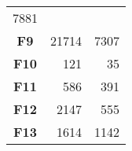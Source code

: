 \documentclass[12pt,a4paper]{article}
\begin{document}
\begin{longtable}[c]{@{}crr@{}}
\begin{minipage}[t]{0.25\columnwidth}
7881
\strut\end{minipage}\tabularnewline
\begin{minipage}[t]{0.13\columnwidth}\centering\strut
\textbf{F9}
\strut\end{minipage} &
\begin{minipage}[t]{0.09\columnwidth}\raggedleft\strut
21714
\strut\end{minipage} &
\begin{minipage}[t]{0.25\columnwidth}\raggedleft\strut
7307
\strut\end{minipage}\tabularnewline
\begin{minipage}[t]{0.13\columnwidth}\centering\strut
\textbf{F10}
\strut\end{minipage} &
\begin{minipage}[t]{0.09\columnwidth}\raggedleft\strut
121
\strut\end{minipage} &
\begin{minipage}[t]{0.25\columnwidth}\raggedleft\strut
35
\strut\end{minipage}\tabularnewline
\begin{minipage}[t]{0.13\columnwidth}\centering\strut
\textbf{F11}
\strut\end{minipage} &
\begin{minipage}[t]{0.09\columnwidth}\raggedleft\strut
586
\strut\end{minipage} &
\begin{minipage}[t]{0.25\columnwidth}\raggedleft\strut
391
\strut\end{minipage}\tabularnewline
\begin{minipage}[t]{0.13\columnwidth}\centering\strut
\textbf{F12}
\strut\end{minipage} &
\begin{minipage}[t]{0.09\columnwidth}\raggedleft\strut
2147
\strut\end{minipage} &
\begin{minipage}[t]{0.25\columnwidth}\raggedleft\strut
555
\strut\end{minipage}\tabularnewline
\begin{minipage}[t]{0.13\columnwidth}\centering\strut
\textbf{F13}
\strut\end{minipage} &
\begin{minipage}[t]{0.09\columnwidth}\raggedleft\strut
1614
\strut\end{minipage} &
\begin{minipage}[t]{0.25\columnwidth}\raggedleft\strut
1142
\strut\end{minipage}\tabularnewline

\end{longtable}
\end{document}
